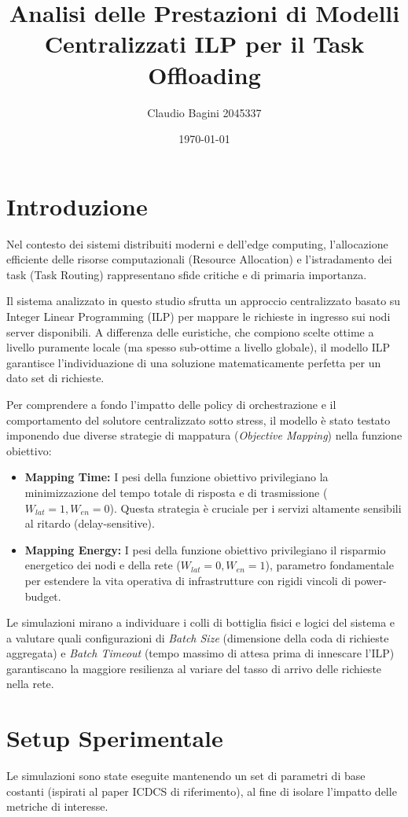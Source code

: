 \documentclass[11pt,a4paper]{article}
\title{\textbf{Analisi delle Prestazioni di Modelli Centralizzati ILP per il Task Offloading}}
\author{Claudio Bagini 2045337}
\date{\today}
\begin{document}
\maketitle

\section{Introduzione}
Nel contesto dei sistemi distribuiti moderni e dell'edge computing, l'allocazione efficiente delle risorse computazionali (Resource Allocation) e l'istradamento dei task (Task Routing) rappresentano sfide critiche e di primaria importanza. 

Il sistema analizzato in questo studio sfrutta un approccio centralizzato basato su Integer Linear Programming (ILP) per mappare le richieste in ingresso sui nodi server disponibili. A differenza delle euristiche, che compiono scelte ottime a livello puramente locale (ma spesso sub-ottime a livello globale), il modello ILP garantisce l'individuazione di una soluzione matematicamente perfetta per un dato set di richieste.

Per comprendere a fondo l'impatto delle policy di orchestrazione e il comportamento del solutore centralizzato sotto stress, il modello è stato testato imponendo due diverse strategie di mappatura (\textit{Objective Mapping}) nella funzione obiettivo:
\begin{itemize}
    \item \textbf{Mapping Time:} I pesi della funzione obiettivo privilegiano la minimizzazione del tempo totale di risposta e di trasmissione ($W_{lat}=1, W_{en}=0$). Questa strategia è cruciale per i servizi altamente sensibili al ritardo (delay-sensitive).
    \item \textbf{Mapping Energy:} I pesi della funzione obiettivo privilegiano il risparmio energetico dei nodi e della rete ($W_{lat}=0, W_{en}=1$), parametro fondamentale per estendere la vita operativa di infrastrutture con rigidi vincoli di power-budget.
\end{itemize}
Le simulazioni mirano a individuare i colli di bottiglia fisici e logici del sistema e a valutare quali configurazioni di \textit{Batch Size} (dimensione della coda di richieste aggregata) e \textit{Batch Timeout} (tempo massimo di attesa prima di innescare l'ILP) garantiscano la maggiore resilienza al variare del tasso di arrivo delle richieste nella rete.

\section{Setup Sperimentale}
Le simulazioni sono state eseguite mantenendo un set di parametri di base costanti (ispirati al paper ICDCS di riferimento), al fine di isolare l'impatto delle metriche di interesse.
\end{document}
